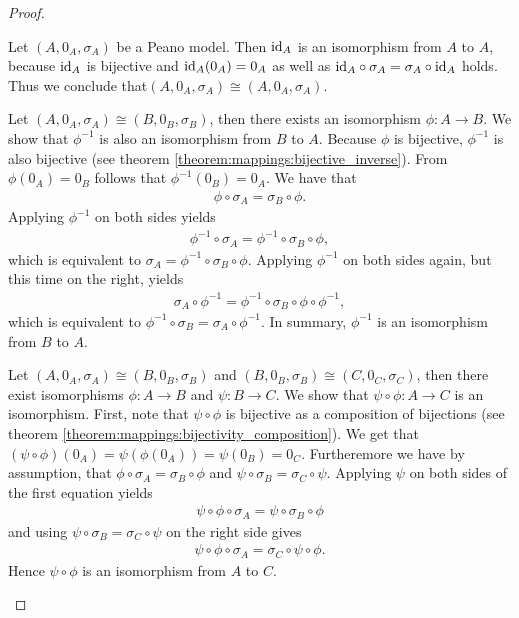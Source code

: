 \begin{proof}
    \begin{proofenumerate}
        \item Let $(A,0_A,\sigma_A)$ be a Peano model. Then $\text{id}_A$ is an isomorphism from $A$ to $A$, because $\text{id}_A$ is bijective and $\text{id}_A(0_A)=0_A$ as well as $\text{id}_A\circ\sigma_A=\sigma_A\circ\text{id}_A$ holds. Thus we conclude that$(A,0_A,\sigma_A)\cong(A,0_A,\sigma_A)$.
        \item Let $(A,0_A,\sigma_A)\cong (B,0_B,\sigma_B)$, then there exists an isomorphism $\phi\colon A\rightarrow B$. We show that $\phi^{-1}$ is also an isomorphism from $B$ to $A$. Because $\phi$ is bijective, $\phi^{-1}$ is also bijective (see theorem \ref{theorem:mappings:bijective_inverse}). From $\phi(0_A)=0_B$ follows that $\phi^{-1}(0_B)=0_A$. We have that \begin{align}\phi\circ\sigma_A=\sigma_B\circ\phi.\end{align} Applying $\phi^{-1}$ on both sides yields \begin{align}\phi^{-1}\circ\sigma_A=\phi^{-1}\circ\sigma_B\circ\phi,\end{align} which is equivalent to $\sigma_A=\phi^{-1}\circ\sigma_B\circ\phi$. Applying $\phi^{-1}$ on both sides again, but this time on the right, yields \begin{align}\sigma_A\circ\phi^{-1}=\phi^{-1}\circ\sigma_B\circ\phi\circ\phi^{-1},\end{align} which is equivalent to $\phi^{-1}\circ\sigma_B=\sigma_A\circ\phi^{-1}$. In summary, $\phi^{-1}$ is an isomorphism from $B$ to $A$.
        \item Let $(A,0_A,\sigma_A)\cong (B,0_B,\sigma_B)$ and $(B,0_B,\sigma_B)\cong(C,0_C,\sigma_C)$, then there exist isomorphisms $\phi\colon A\to B$ and $\psi\colon B\to C$. We show that $\psi\circ\phi\colon A\to C$ is an isomorphism. First, note that $\psi\circ\phi$ is bijective as a composition of bijections (see theorem \ref{theorem:mappings:bijectivity_composition}). We get that $(\psi\circ\phi)(0_A)=\psi(\phi(0_A))=\psi(0_B)=0_C$. Furtheremore we have by assumption, that $\phi\circ\sigma_A=\sigma_B\circ\phi$ and $\psi\circ\sigma_B=\sigma_C\circ\psi$. Applying $\psi$ on both sides of the first equation yields
        \begin{align}\psi\circ\phi\circ\sigma_A=\psi\circ\sigma_B\circ\phi\end{align}
        and using $\psi\circ\sigma_B=\sigma_C\circ\psi$ on the right side gives
        \begin{align}\psi\circ\phi\circ\sigma_A=\sigma_C\circ\psi\circ\phi.\end{align}
        Hence $\psi\circ\phi$ is an isomorphism from $A$ to $C$.
    \end{proofenumerate}
\end{proof}

